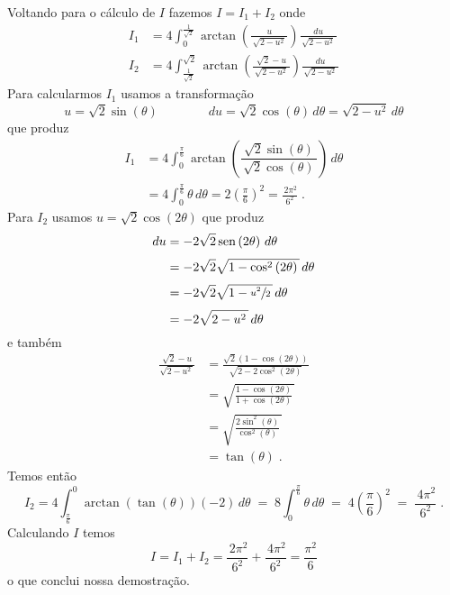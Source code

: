 Voltando para o cálculo de $I$ fazemos $I=I_1+I_2$ onde
\begin{align*}
  I_1 & = 4 \int_{0}^{\frac{1}{\sqrt{2}}}
  \arctan\left(\frac{u}{\,\sqrt{2-u^2}\,}\right)
  \frac{du}{\,\sqrt{2-u^2}\,}
  \\[3mm]
  I_2 & = 4 \int_{\frac{1}{\sqrt{2}}}^{\sqrt{2}}
  \arctan\left(\frac{\sqrt{2}-u}{\,\sqrt{2-u^2}\,}\right)
  \frac{du}{\,\sqrt{2-u^2}\,}
\end{align*}
Para calcularmos $I_1$ usamos a transformação
\[
u = \sqrt{2} \sin\left(\theta\right)
\qquad\qquad
du = \sqrt{2} \cos\left(\theta\right) \,d\theta
= \sqrt{2-u^2}\,d\theta
\]
que produz
\begin{align*}
  I_1 & = 4 \int_{0}^{\frac{\pi}{6}}
  \arctan\left(\dfrac{  \sqrt{2} \sin\left(\theta\right)}
  {\,\sqrt{2} \cos\left(\theta\right)\,}\right)
  \,d\theta
  \\[3mm]
  & = 4 \int_{0}^{\frac{\pi}{6}} \theta \,d\theta
  = 2 \left(\frac{\pi}{6}\right)^2
  = \frac{\,2 \pi^2}{6^2}    \;.
\end{align*}
Para $I_2$ usamos \(u = \sqrt{2} \cos\left(2\theta\right)\) que produz
\begin{align*}
  du & = -2\sqrt{2} \operatorname{sen}\left(2\theta\right)                \,d\theta \\[1mm]
  & = -2\sqrt{2} \sqrt{1 - \cos^2\left(2\theta\right)\,} \,d\theta \\[1mm]
  & = -2\sqrt{2} \sqrt{1 - \sfrac{u^2}{2}\,}             \,d\theta \\[1mm]
  & = -2\sqrt{2 - u^2\,}                                 \,d\theta
\end{align*}
e também
\begin{align*}
  \frac{\sqrt{2}-u}{\sqrt{2-u^2\,}}
  & = \frac{\sqrt{2}(1-\cos(2\theta))}{\sqrt{2 - 2\cos^2(2\theta)}} \\[3mm]
  & = \sqrt{\frac{1-\cos(2\theta)}{1 + \cos(2\theta)}\,}            \\[3mm]
  & = \sqrt{\frac{2\sin^2(\theta)}{\cos^2(\theta)}\,}               \\[3mm]
  & = \tan(\theta)  \;.
\end{align*}
Temos então
\[
I_2   =   4 \int_{\frac{\pi}{6}}^{0} \arctan\left(\tan(\theta)\right) (-2)\,d\theta
\;=\; 8 \int_{0}^{\frac{\pi}{6}} \theta \,d\theta
\;=\; 4 \left(\frac{\pi}{6}\right)^2
\;=\; \frac{\,4 \pi^2}{6^2}  \;.
\]
Calculando $I$ temos
\[
I = I_1 + I_2
= \frac{\,2 \pi^2}{6^2}
+ \frac{\,4 \pi^2}{6^2}
= \frac{\pi^2}{6}
\]
o que conclui nossa demostração.

